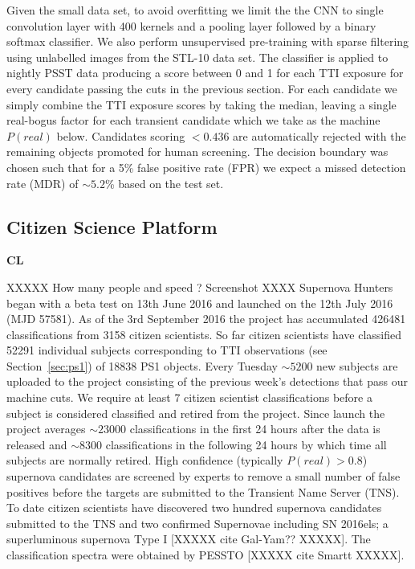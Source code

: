 \documentclass[a4paper,fleqn,usenatbib]{mnras}
\begin{document}
Given the small data set, to avoid overfitting we limit the the CNN to single convolution layer with 400 kernels and a pooling layer followed by a binary softmax classifier.  We also perform unsupervised pre-training with sparse filtering \citet{Ngiam11} using unlabelled images from the STL-10 \citep{Coates11} data set.  The classifier is applied to nightly PSST data producing a score between 0 and 1 for each TTI exposure for every candidate passing the cuts in the previous section.  For each candidate we simply combine the TTI exposure scores by taking the median, leaving a single real-bogus factor for each transient candidate which we take as the machine $P(real)$ below.  Candidates scoring $< 0.436$ are automatically rejected with the remaining objects promoted for human screening.  The decision boundary was chosen such that for a 5\% false positive rate (FPR) we expect a missed detection rate (MDR) of $\sim5.2$\% based on
the test set.

\subsection{Citizen Science Platform}

\textbf{CL}

XXXXX How many people and speed ? Screenshot XXXX 
Supernova Hunters began with a beta test on 13th June 2016 and launched on the 12th July 2016 (MJD 57581).  As of the 3rd September 2016 the project has accumulated 426481 classifications from 3158 citizen scientists.  So far citizen scientists have classified 52291 individual subjects corresponding to TTI observations (see Section~\ref{sec:ps1}) of 18838 PS1 objects.  Every Tuesday $\sim5200$ new subjects are uploaded to the project consisting of the previous week's detections that pass our machine cuts.  We require at least 7 citizen scientist classifications before a subject is considered classified and retired from the project.  Since launch the project averages $\sim23000$ classifications in the first 24 hours after the data is released and $\sim8300$ classifications in the following 24 hours by which time all subjects are normally retired. High confidence (typically $P(real)>0.8$) supernova candidates are screened by experts to remove a small number of false positives before the targets are submitted to the Transient Name Server (TNS).  To date citizen scientists have discovered two hundred supernova candidates submitted to the TNS and two confirmed Supernovae including SN 2016els; a superluminous supernova Type I [XXXXX cite Gal-Yam?? XXXXX].  The classification spectra were obtained by PESSTO [XXXXX cite Smartt XXXXX].
\end{document}
